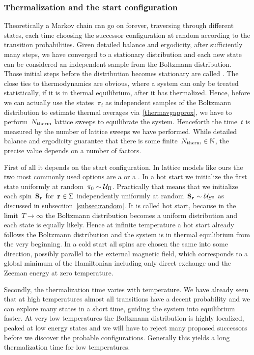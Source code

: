 \subsubsection{Thermalization and the start configuration}

Theoretically a Markov chain can go on forever, traversing through different
states, each time choosing the successor configuration at random according to
the transition probabilities. Given detailed balance and ergodicity, after
sufficiently many steps, we have converged to a stationary distribution and each
new state can be considered an independent sample from the Boltzmann
distribution. Those initial steps before the distribution becomes stationary are
called . The close ties to thermodynamics are obvious,
where a system can only be treated statistically, if it is in thermal
equilibrium, \ie{} after it has thermalized. Hence, before we can actually use
the states~$\pi_i$ as independent samples of the Boltzmann distribution to
estimate thermal averages via~\eqref{thermavgapprox}, we have to
perform~$N_{\mathrm{therm}}$ lattice sweeps to equilibrate the system. Henceforth the
time~$t$ is measured by the number of lattice sweeps we have performed. While
detailed balance and ergodicity guarantee that there is some finite~$N_{\mathrm{therm}} \in
\mathbb{N}$, the precise value depends on a number of factors.

First of all it depends on the start configuration. In lattice models like ours
the two most commonly used options are a  or a . In a hot start we initialize the first state uniformly at random~$\pi_0
\sim \mathcal{U}_{\Pi}$.  Practically that means that we initialize each spin~$\mathbf{S}_{\mathbf{r}}$
for~$\mathbf{r} \in \Sigma$ independently uniformly at random~$\mathbf{S}_{\mathbf{r}} \sim \mathcal{U}_{S^2}$
as discussed in subsection~\ref{subsec:random}. It is called hot start, because
in the limit~$T\to \infty$ the Boltzmann distribution becomes a uniform
distribution and each state is equally likely. Hence at infinite temperature a
hot start already follows the Boltzmann distribution and the system is in
thermal equilibrium from the very beginning. In a cold start all spins are
chosen the same into some direction, possibly parallel to the external magnetic
field, which corresponds to a global minimum of the Hamiltonian  including only
direct exchange and the Zeeman energy at zero temperature.

Secondly, the thermalization time varies with temperature. We have already seen
that at high temperatures almost all transitions have a decent probability and
we can explore many states in a short time, guiding the system into equilibrium
faster. At very low temperatures the Boltzmann distribution is highly localized,
peaked at low energy states and we will have to reject many proposed successors
before we discover the probable configurations. Generally this yields a long
thermalization time for low temperatures.

